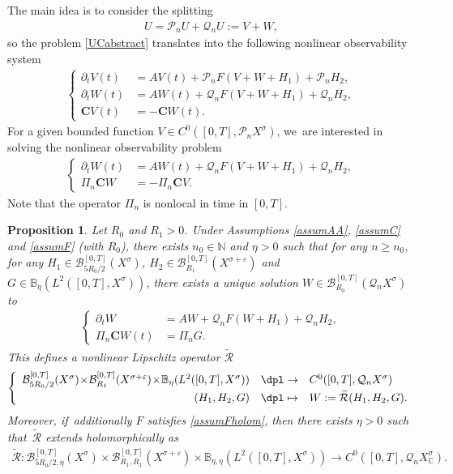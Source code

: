 \documentclass[JEP,XML,SOM,Unicode,published]{cedram}
\newcommand\mto{\mathchoice{\longmapsto}{\mapsto}{\mapsto}{\mapsto}}
\newtheorem{proposition}[theorem]{Proposition}
\theoremstyle{definition}
\let\mc\mathcal
\let\veps\varepsilon
\newcommand{\B}{\mc{B}}
\newcommand{\N}{\mathbb{N}}
\newcommand{\Q}{\mathcal{Q}}
\renewcommand{\P}{\mathcal{P}}
\newcommand{\bC}{\boldsymbol{C}}
\begin{document}
The main idea is to consider the splitting
\begin{align*}
U=\P_n U+\Q_n U:=V+W,
\end{align*}
so the problem \eqref{UCabstract} translates into the following nonlinear observability system
\begin{align*}
\left\{\begin{array}{rl}
\partial_t V(t)&=AV(t)+\P_n F( V+W+H_{1})+\P_{n}H_{2}, \\[3pt]
\partial_t W(t)&=AW(t)+\Q_n F(V+W+H_{1})+\Q_{n}H_{2}, \\[3pt]
\bC V(t)&=-\bC W(t).
\end{array}\right.
\end{align*}
For a given bounded function $V\in C^0([0, T], \P_n X^\sigma)$, we~are interested in solving the nonlinear observability problem
\begin{align*}
\left\{\begin{array}{rl}
\partial_t W(t)&=AW(t)+\Q_n F(V+W+H_{1})+\Q_{n}H_{2}, \\[3pt]
\Pi_n\bC W &=- \Pi_n\bC V.
\end{array}\right.
\end{align*}
Note that the operator $\Pi_{n}$ is nonlocal in time in $[0,T]$.
\begin{proposition}\label{propabstract}
Let $R_{0}$ and $R_{1}>0$. Under Assumptions \ref{assumAA}, \ref{assumC} and \ref{assumF} (with $R_{0}$), there exists $n_{0}\in \N$ and $\eta>0$ such that for any $n\geq n_{0}$, for any $H_{1}\in \B_{5R_{0}/2}^{[0,T]}(X^{\sigma})$, $H_{2}\in \B_{R_{1}}^{[0,T]}(X^{\sigma+\veps})$ and $G\in \mathbb{B}_{\eta}(L^2([0, T], X^{\sigma}))$, there exists a unique solution $W\in \B_{R_{0}}^{[0,T]}(\Q_n X^{\sigma})$ to
\begin{align}\label{eqWG}
\left\{\begin{array}{rl}
\partial_t W&=AW+\Q_n F(W+H_{1})+\Q_{n}H_{2}, \\[3pt]
\Pi_n\bC W(t) &=\Pi_nG.
\end{array}\right.
\end{align}
This defines a nonlinear Lipschitz operator $\mathcal{\widetilde{R}}$
\begin{align}
\left\{\begin{array}{rcl}
\B_{5R_{0}/2}^{[0,T]}(X^{\sigma}) \!\times\! \B_{R_{1}}^{[0,T]}(X^{\sigma+\veps}) \!\times\! \mathbb{B}_{\eta}(L^{2}([0,T],X^{\sigma})) & \dpl\to& C^0([0, T], \Q_{n }X^{\sigma})\\[3pt]
(H_{1},H_{2},G)&\dpl\mto& W:=\mathcal{\widetilde{R}}(H_{1},H_{2},G).
\end{array}\right.
\end{align}
Moreover, if~additionally $F$ satisfies \cref{assumFholom}, then there exists $\eta>0$ such that~$\mathcal{\widetilde{R}}$ extends holomorphically as
\begin{align*}
\mathcal{\widetilde{R}}: \B_{5R_{0}/2,\eta}^{[0,T]}(X^{\sigma}) \times \B_{R_{1}, R_{1}}^{[0,T]}(X^{\sigma+\veps})\times \mathbb{B}_{\eta,\eta}(L^{2}([0,T],X^{\sigma})) \to C^0([0, T], \Q_{n }X^{\sigma}_{\mathbb{C}}).
\end{align*}
\end{proposition}
\end{document}
